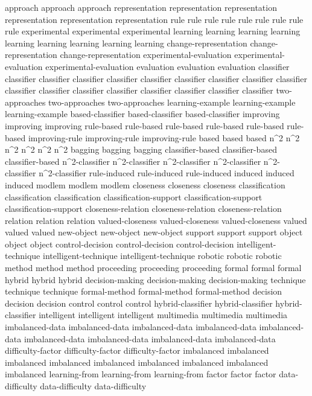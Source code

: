 approach	approach	approach	
representation	representation	representation	representation	representation	representation	
rule	rule	rule	rule	rule	rule	rule	rule	rule	
experimental	experimental	experimental	
learning	learning	learning	learning	learning	learning	learning	learning	learning	
change-representation	change-representation	change-representation	
experimental-evaluation	experimental-evaluation	experimental-evaluation	
evaluation	evaluation	evaluation	
classifier	classifier	classifier	classifier	classifier	classifier	classifier	classifier	classifier	classifier	classifier	classifier	classifier	classifier	classifier	classifier	classifier	classifier	
two-approaches	two-approaches	two-approaches	
learning-example	learning-example	learning-example	
based-classifier	based-classifier	based-classifier	
improving	improving	improving	
rule-based	rule-based	rule-based	rule-based	rule-based	rule-based	
improving-rule	improving-rule	improving-rule	
based	based	based	
n^2	n^2	n^2	n^2	n^2	n^2	
bagging	bagging	bagging	
classifier-based	classifier-based	classifier-based	
n^2-classifier	n^2-classifier	n^2-classifier	n^2-classifier	n^2-classifier	n^2-classifier	
rule-induced	rule-induced	rule-induced	
induced	induced	induced	
modlem	modlem	modlem	
closeness	closeness	closeness	
classification	classification	classification	
classification-support	classification-support	classification-support	
closeness-relation	closeness-relation	closeness-relation	
relation	relation	relation	
valued-closeness	valued-closeness	valued-closeness	
valued	valued	valued	
new-object	new-object	new-object	
support	support	support	
object	object	object	
control-decision	control-decision	control-decision	
intelligent-technique	intelligent-technique	intelligent-technique	
robotic	robotic	robotic	
method	method	method	
proceeding	proceeding	proceeding	
formal	formal	formal	
hybrid	hybrid	hybrid	
decision-making	decision-making	decision-making	
technique	technique	technique	
formal-method	formal-method	formal-method	
decision	decision	decision	
control	control	control	
hybrid-classifier	hybrid-classifier	hybrid-classifier	
intelligent	intelligent	intelligent	
multimedia	multimedia	multimedia	
imbalanced-data	imbalanced-data	imbalanced-data	imbalanced-data	imbalanced-data	imbalanced-data	imbalanced-data	imbalanced-data	imbalanced-data	
difficulty-factor	difficulty-factor	difficulty-factor	
imbalanced	imbalanced	imbalanced	imbalanced	imbalanced	imbalanced	imbalanced	imbalanced	imbalanced	
learning-from	learning-from	learning-from	
factor	factor	factor	
data-difficulty	data-difficulty	data-difficulty	
